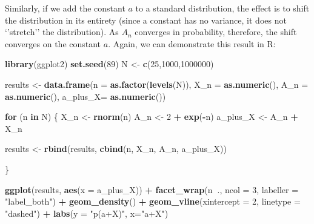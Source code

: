 \documentclass[
]{book}
\newenvironment{Shaded}{\begin{snugshade}}{\end{snugshade}}
\newcommand{\ControlFlowTok}[1]{\textcolor[rgb]{0.13,0.29,0.53}{\textbf{#1}}}
\newcommand{\DataTypeTok}[1]{\textcolor[rgb]{0.13,0.29,0.53}{#1}}
\newcommand{\DecValTok}[1]{\textcolor[rgb]{0.00,0.00,0.81}{#1}}
\newcommand{\KeywordTok}[1]{\textcolor[rgb]{0.13,0.29,0.53}{\textbf{#1}}}
\newcommand{\NormalTok}[1]{#1}
\newcommand{\OperatorTok}[1]{\textcolor[rgb]{0.81,0.36,0.00}{\textbf{#1}}}
\newcommand{\StringTok}[1]{\textcolor[rgb]{0.31,0.60,0.02}{#1}}
\begin{document}
Similarly, if we add the constant \(a\) to a standard distribution, the effect is to shift the distribution in its entirety (since a constant has no variance, it does not `'stretch'' the distribution). As \(A_n\) converges in probability, therefore, the shift converges on the constant \(a\). Again, we can demonstrate this result in R:

\begin{Shaded}
\begin{Highlighting}[]
\KeywordTok{library}\NormalTok{(ggplot2)}
\KeywordTok{set.seed}\NormalTok{(}\DecValTok{89}\NormalTok{)}
\NormalTok{N <-}\StringTok{ }\KeywordTok{c}\NormalTok{(}\DecValTok{25}\NormalTok{,}\DecValTok{1000}\NormalTok{,}\DecValTok{1000000}\NormalTok{)}

\NormalTok{results <-}\StringTok{ }\KeywordTok{data.frame}\NormalTok{(}\DataTypeTok{n =} \KeywordTok{as.factor}\NormalTok{(}\KeywordTok{levels}\NormalTok{(N)),}
                      \DataTypeTok{X_n =} \KeywordTok{as.numeric}\NormalTok{(),}
                      \DataTypeTok{A_n =} \KeywordTok{as.numeric}\NormalTok{(),}
                      \DataTypeTok{a_plus_X=} \KeywordTok{as.numeric}\NormalTok{())}

\ControlFlowTok{for}\NormalTok{ (n }\ControlFlowTok{in}\NormalTok{ N) \{}
\NormalTok{  X_n <-}\StringTok{ }\KeywordTok{rnorm}\NormalTok{(n)}
\NormalTok{  A_n <-}\StringTok{ }\DecValTok{2} \OperatorTok{+}\StringTok{ }\KeywordTok{exp}\NormalTok{(}\OperatorTok{-}\NormalTok{n)}
\NormalTok{  a_plus_X <-}\StringTok{ }\NormalTok{A_n }\OperatorTok{+}\StringTok{ }\NormalTok{X_n}
  
\NormalTok{  results <-}\StringTok{ }\KeywordTok{rbind}\NormalTok{(results, }\KeywordTok{cbind}\NormalTok{(n, X_n, A_n, a_plus_X))}
  
\NormalTok{\}}

\KeywordTok{ggplot}\NormalTok{(results, }\KeywordTok{aes}\NormalTok{(}\DataTypeTok{x =}\NormalTok{ a_plus_X)) }\OperatorTok{+}
\StringTok{  }\KeywordTok{facet_wrap}\NormalTok{(n}\OperatorTok{~}\NormalTok{., }\DataTypeTok{ncol =} \DecValTok{3}\NormalTok{, }\DataTypeTok{labeller =} \StringTok{"label_both"}\NormalTok{) }\OperatorTok{+}
\StringTok{  }\KeywordTok{geom_density}\NormalTok{() }\OperatorTok{+}
\StringTok{  }\KeywordTok{geom_vline}\NormalTok{(}\DataTypeTok{xintercept =} \DecValTok{2}\NormalTok{, }\DataTypeTok{linetype =} \StringTok{"dashed"}\NormalTok{) }\OperatorTok{+}
\StringTok{  }\KeywordTok{labs}\NormalTok{(}\DataTypeTok{y =} \StringTok{"p(a+X)"}\NormalTok{, }\DataTypeTok{x=}\StringTok{"a+X"}\NormalTok{)}
\end{Highlighting}
\end{Shaded}
\end{document}

